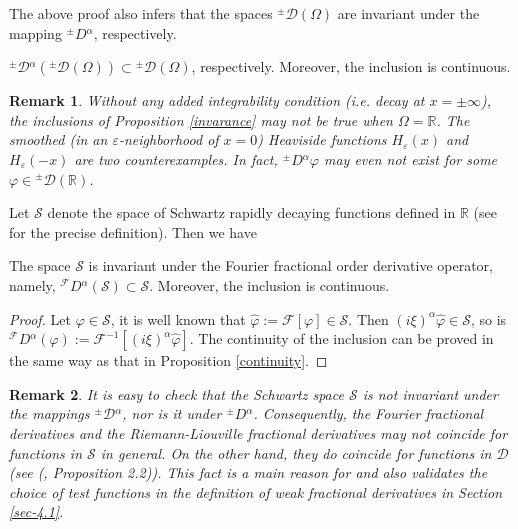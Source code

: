 \documentclass[leqno,final]{siamltex}
\numberwithin{equation}{section}
\newtheorem{remark}{Remark}[section]
\newcommand{\eps}{\varepsilon}
\renewcommand{\(}{\bigl(}
\renewcommand{\)}{\bigr)}
\newcommand{\R}{\mathbb{R}}
\begin{document}
The above proof also infers that  the  spaces ${^{\pm}}{\mathscr{D}}(\Omega)$ are invariant 
under the mapping ${^{\pm}}{D}{^{\alpha}}$, respectively. 

\begin{proposition}\label{invarance}
	${^{\pm}}{\mathcal{D}}{^{\alpha}} ({^{\pm}}{\mathscr{D}}(\Omega) )\subset 
	{^{\pm}}{\mathscr{D}}(\Omega)$, respectively. Moreover, the inclusion is continuous. 
\end{proposition}

\begin{remark}
	Without any added integrability condition (i.e. decay at $x=\pm \infty$), the inclusions of Proposition \ref{invarance} may not be 
	true when $\Omega=\R$.  The smoothed (in an $\eps$-neighborhood of $x=0$) Heaviside functions $H_\eps(x)$ and $H_\eps (-x)$ are two counterexamples.  In fact, ${^{\pm}}{{D}}{^{\alpha}} \varphi$ may even not exist for some $\varphi\in  
	{^{\pm}}{\mathscr{D}}(\R)$. 
\end{remark}

Let $\mathcal{S}$ denote the space of Schwartz rapidly decaying functions defined in $\R$ (see \cite{Rudin} for the precise definition). Then we have

\begin{lemma}\label{invaranceF}
The space $\mathcal{S}$ is invariant under the Fourier fractional order derivative operator, namely, 	
$ {^{\mathcal{F}}}{D}{^{\alpha}}(\mathcal{S}) \subset \mathcal{S}$.  Moreover, the 
inclusion is continuous. 
\end{lemma}

\begin{proof}
	Let $\varphi\in \mathcal{S}$, it is well known \cite{Adams, Rudin} that $\hat{\varphi}:=\mathcal{F}[\varphi] \in \mathcal{S}$.
	Then $(i\xi)^\alpha \hat{\varphi} \in \mathcal{S}$, so is 
	$ {^{\mathcal{F}}}{D}{^{\alpha}}(\varphi):=\mathcal{F}^{-1} [(i\xi)^\alpha \hat{\varphi}]$. 
	The continuity of the inclusion can be proved in the same way as that in Proposition \ref{continuity}.
\end{proof}

\begin{remark}
	It is easy to check that the Schwartz space $\mathcal{S}$  is not invariant under the mappings
	${^{\pm}}{\mathcal{D}}{^{\alpha}}$, nor is it under ${^{\pm}}{D}{^{\alpha}}$.  Consequently,
	the Fourier fractional derivatives and the Riemann-Liouville fractional derivatives may not coincide 
	for functions in $\mathcal{S}$ in general. 	On the other hand, they do coincide for functions
	in $\mathscr{D}$ (see   (\cite{Feng_Sutton}, Proposition 2.2)). 
	This fact is a main reason for and also validates the choice 	of test functions in the definition of weak fractional derivatives in Section \ref{sec-4.1}. 
\end{remark}
\end{document}
